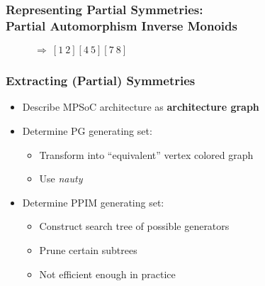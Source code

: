\documentclass{beamer}
\begin{document}
\begin{frame}
  \frametitle{Representing Partial Symmetries:\\Partial Automorphism Inverse Monoids}

  \begin{figure}
    \centering
    \begin{subfigure}{.2\paperwidth}
      \centering
    \end{subfigure}
    \qquad\qquad\Large$\Rightarrow$\normalsize$\ [1\ 2][4\ 5][7\ 8]$
  \end{figure}
\end{frame}

\begin{frame}
  \frametitle{Extracting (Partial) Symmetries}

  \begin{itemize}
    \setlength\itemsep{.25cm}

    \item<1-> Describe MPSoC architecture as \textbf{architecture graph}

    \item<2-> Determine PG generating set:
      \begin{itemize}
        \item<3-> Transform into ``equivalent'' vertex colored graph
        \item<4-> Use \textit{nauty}~\cite{nauty}
      \end{itemize}
    \item<5-> Determine PPIM generating set:
      \begin{itemize}
        \item<6-> Construct search tree of possible generators
        \item<7-> Prune certain subtrees
        \item<8-> Not efficient enough in practice
      \end{itemize}
  \end{itemize}
\end{frame}
\end{document}
